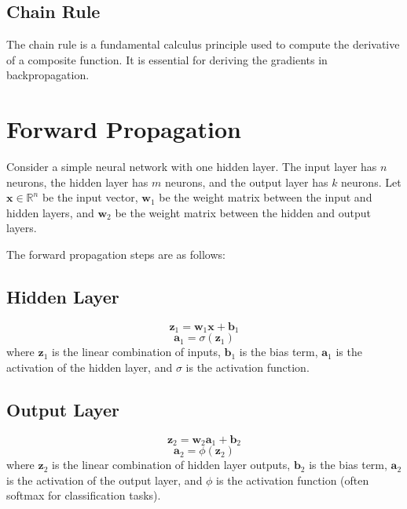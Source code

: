 \subsection{Chain Rule}
The chain rule is a fundamental calculus principle used to compute the derivative of a composite function. It is essential for deriving the gradients in backpropagation.

\section{Forward Propagation}

Consider a simple neural network with one hidden layer. The input layer has \(n\) neurons, the hidden layer has \(m\) neurons, and the output layer has \(k\) neurons. Let \(\mathbf{x} \in \mathbb{R}^n\) be the input vector, \(\mathbf{w}_{1}\) be the weight matrix between the input and hidden layers, and \(\mathbf{w}_{2}\) be the weight matrix between the hidden and output layers.

The forward propagation steps are as follows:

\subsection{Hidden Layer}
\begin{equation}
\mathbf{z}_{1} = \mathbf{w}_{1} \mathbf{x} + \mathbf{b}_{1}
\end{equation}
\begin{equation}
\mathbf{a}_{1} = \sigma(\mathbf{z}_{1})
\end{equation}
where \(\mathbf{z}_{1}\) is the linear combination of inputs, \(\mathbf{b}_{1}\) is the bias term, \(\mathbf{a}_{1}\) is the activation of the hidden layer, and \(\sigma\) is the activation function.

\subsection{Output Layer}
\begin{equation}
\mathbf{z}_{2} = \mathbf{w}_{2} \mathbf{a}_{1} + \mathbf{b}_{2}
\end{equation}
\begin{equation}
\mathbf{a}_{2} = \phi(\mathbf{z}_{2})
\end{equation}
where \(\mathbf{z}_{2}\) is the linear combination of hidden layer outputs, \(\mathbf{b}_{2}\) is the bias term, \(\mathbf{a}_{2}\) is the activation of the output layer, and \(\phi\) is the activation function (often softmax for classification tasks).

